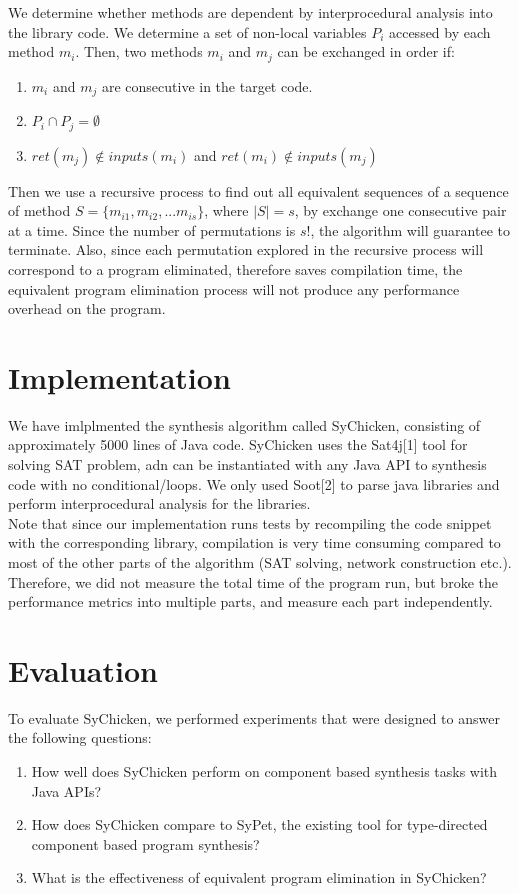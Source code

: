 \documentclass[twocolumn]{article}
\begin{document}
We determine whether methods are dependent by interprocedural analysis into the library code. We determine a set of non-local variables $P_i$ accessed by each method $m_i$. Then, two methods $m_i$ and $m_j$ can be exchanged in order if:
\begin{enumerate}
    \item $m_i$ and $m_j$ are consecutive in the target code.
    \item $P_i \cap P_j = \emptyset$
    \item $ret(m_j) \notin inputs(m_i)$ and $ret(m_i) \notin inputs(m_j)$
\end{enumerate}
Then we use a recursive process to find out all equivalent sequences of a sequence of method $S = \{m_{i1},m_{i2},...m_{is}\}$, where $|S| = s$, by exchange one consecutive pair at a time. Since the number of permutations is $s!$, the algorithm will guarantee to terminate. Also, since each permutation explored in the recursive process will correspond to a program eliminated, therefore saves compilation time, the equivalent program elimination process will not produce any performance overhead on the program.\\

\section{Implementation}
We have imlplmented the synthesis algorithm called SyChicken, consisting of approximately 5000 lines of Java code. SyChicken uses the Sat4j[1] tool for solving SAT problem, adn can be instantiated with any Java API to synthesis code with no conditional/loops. We only used Soot[2] to parse java libraries and perform interprocedural analysis for the libraries.\\

Note that since our implementation runs tests by recompiling the code snippet with the corresponding library, compilation is very time consuming compared to most of the other parts of the algorithm (SAT solving, network construction etc.). Therefore, we did not measure the total time of the program run, but broke the performance metrics into multiple parts, and measure each part independently.\\

\section{Evaluation}
To evaluate SyChicken, we performed experiments that were designed to answer the following questions:
\begin{enumerate}
    \item How well does SyChicken perform on component based synthesis tasks with Java APIs?
    \item How does SyChicken compare to SyPet, the existing tool for type-directed component based program synthesis?
    \item What is the effectiveness of equivalent program elimination in SyChicken?
\end{enumerate}
\end{document}
